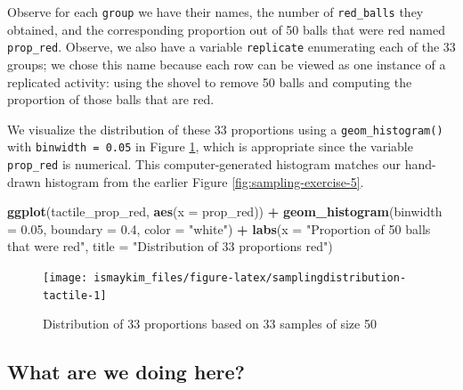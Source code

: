 \documentclass[12pt, krantz2,]{krantz}
\makeatletter
\newenvironment{Shaded}{\begin{snugshade}}{\end{snugshade}}
\newcommand{\DataTypeTok}[1]{\textcolor[rgb]{0.27,0.27,0.27}{#1}}
\newcommand{\FloatTok}[1]{\textcolor[rgb]{0.06,0.06,0.06}{#1}}
\newcommand{\KeywordTok}[1]{\textcolor[rgb]{0.27,0.27,0.27}{\textbf{#1}}}
\newcommand{\NormalTok}[1]{#1}
\newcommand{\OperatorTok}[1]{\textcolor[rgb]{0.43,0.43,0.43}{\textbf{#1}}}
\newcommand{\StringTok}[1]{\textcolor[rgb]{0.5,0.5,0.5}{#1}}
\newenvironment{kframe}{%
\medskip{}
\setlength{\fboxsep}{.8em}
 \def\at@end@of@kframe{}%
 \ifinner\ifhmode%
  \def\at@end@of@kframe{\end{minipage}}%
  \begin{minipage}{\columnwidth}%
 \fi\fi%
 \def\FrameCommand##1{\hskip\@totalleftmargin \hskip-\fboxsep
 \colorbox{shadecolor}{##1}\hskip-\fboxsep
     \hskip-\linewidth \hskip-\@totalleftmargin \hskip\columnwidth}%
 \MakeFramed {\advance\hsize-\width
   \@totalleftmargin\z@ \linewidth\hsize
   \@setminipage}}%
 {\par\unskip\endMakeFramed%
 \at@end@of@kframe}
\renewenvironment{Shaded}{\begin{kframe}}{\end{kframe}}
\makeatother
\begin{document}
Observe for each \texttt{group} we have their names, the number of \texttt{red\_balls} they obtained, and the corresponding proportion out of 50 balls that were red named \texttt{prop\_red}. Observe, we also have a variable \texttt{replicate} enumerating each of the 33 groups; we chose this name because each row can be viewed as one instance of a replicated activity: using the shovel to remove 50 balls and computing the proportion of those balls that are red.

We visualize the distribution of these 33 proportions using a \texttt{geom\_histogram()} with \texttt{binwidth\ =\ 0.05} in Figure \ref{fig:samplingdistribution-tactile}, which is appropriate since the variable \texttt{prop\_red} is numerical. This computer-generated histogram matches our hand-drawn histogram from the earlier Figure \ref{fig:sampling-exercise-5}.

\begin{Shaded}
\begin{Highlighting}[]
\KeywordTok{ggplot}\NormalTok{(tactile_prop_red, }\KeywordTok{aes}\NormalTok{(}\DataTypeTok{x =}\NormalTok{ prop_red)) }\OperatorTok{+}
\StringTok{  }\KeywordTok{geom_histogram}\NormalTok{(}\DataTypeTok{binwidth =} \FloatTok{0.05}\NormalTok{, }\DataTypeTok{boundary =} \FloatTok{0.4}\NormalTok{, }\DataTypeTok{color =} \StringTok{"white"}\NormalTok{) }\OperatorTok{+}
\StringTok{  }\KeywordTok{labs}\NormalTok{(}\DataTypeTok{x =} \StringTok{"Proportion of 50 balls that were red"}\NormalTok{, }
       \DataTypeTok{title =} \StringTok{"Distribution of 33 proportions red"}\NormalTok{) }
\end{Highlighting}
\end{Shaded}

\begin{figure}

{\centering \texttt{[image: ismaykim\_files/figure-latex/samplingdistribution-tactile-1]} 

}

\caption{Distribution of 33 proportions based on 33 samples of size 50}\label{fig:samplingdistribution-tactile}
\end{figure}

\hypertarget{what-are-we-doing-here}{%
\subsection{What are we doing here?}\label{what-are-we-doing-here}}
\end{document}
